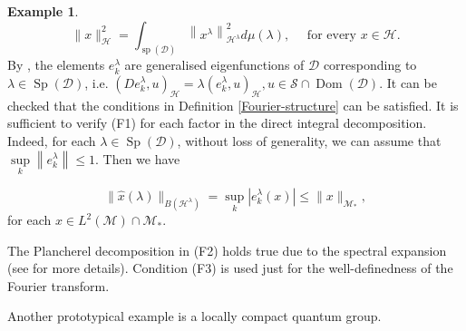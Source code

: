 \documentclass[a4paper,12pt]{amsart}
\numberwithin{equation}{section}
\theoremstyle{definition}
\newtheorem{ex}[thm]{Example}
\begin{document}
\begin{ex}
\begin{equation*}
\|x\|_{\mathcal{H}}^{2}=\int_{\operatorname{sp}(\mathcal{D})}\left\|x^{\lambda}\right\|_{\mathcal{H}^{\lambda}}^{2} d \mu(\lambda), \quad \text { for every } x \in \mathcal{H}.
\end{equation*}
By \cite[Theorem 2, p. 6]{LT16}, the elements $e_{k}^{\lambda}$ are generalised eigenfunctions of $\mathcal{D}$ corresponding to $\lambda \in \operatorname{Sp}(\mathcal{D})$, i.e. $\left(D e_{k}^{\lambda}, u\right)_{\mathcal{H}}=\lambda\left(e_{k}^{\lambda}, u\right)_{\mathcal{H}},  u \in \mathcal{S} \cap \operatorname{Dom}(\mathcal{D})$. It can be checked that the conditions in Definition \ref{Fourier-structure} can be satisfied. It is sufficient to verify (F1) for each factor in the direct integral decomposition. Indeed, for each $\lambda \in \operatorname{Sp}(\mathcal{D})$, without loss of generality, we can assume that $\sup\limits_{k}\left\|e_{k}^{\lambda}\right\| \leq 1$. Then we have

$$
\|\widehat{x}(\lambda)\|_{B\left(\mathcal{H}^{\lambda}\right)}=\sup _{k}\left|e_{k}^{\lambda}(x)\right| \leq\|x\|_{\mathcal{M}_{*}},
$$
for each $x \in L^2(\mathcal{M}) \cap \mathcal{M}_{*}$.

The Plancherel decomposition in (F2) holds true due to the spectral expansion (see \cite[Formula (PF)]{LT16} for more details). Condition (F3) is used just for the well-definedness of the Fourier transform.
\end{ex}
Another prototypical example is a locally compact quantum group.
\end{document}

